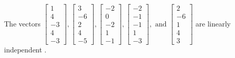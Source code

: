 \begin{exercise}
\begin{exerciseStatement}
  \end{exerciseStatement}
  \begin{exerciseAnswer}
   The vectors \(\left[\begin{array}{r}
1 \\
4 \\
-3 \\
4 \\
-3
\end{array}\right] , \left[\begin{array}{r}
3 \\
-6 \\
2 \\
4 \\
-5
\end{array}\right] , \left[\begin{array}{r}
-2 \\
0 \\
-2 \\
1 \\
-1
\end{array}\right] , \left[\begin{array}{r}
-2 \\
-1 \\
-1 \\
1 \\
-3
\end{array}\right] , \text{ and } \left[\begin{array}{r}
2 \\
-6 \\
1 \\
4 \\
3
\end{array}\right]\) are 
  	 linearly independent  .
  


  \end{exerciseAnswer}
\end{exercise}
